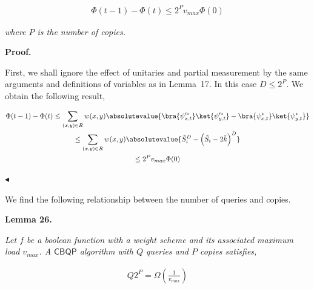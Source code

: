 \documentclass[10pt,a4paper]{article}
\begin{document}
\[\begin{gathered}
\displaystyle\Phi(t-1)-\Phi(t)\leq 2^{P}v_{max}\Phi(0)
\end{gathered}\]


\emph{where $P$ is the number of copies.}\par






\par\medskip\noindent\textbf{Proof.}\par




First, we shall ignore the effect of unitaries and partial measurement by the same arguments and definitions of variables as in Lemma 17. In this case $D\leq 2^{P}$. We obtain the following result,\par


\[\begin{gathered}
\displaystyle\Phi(t-1)-\Phi(t)\leq \displaystyle\sum_{(x,y)\in R}w(x,y)\absolutevalue{\bra{\psi_{x,t}^{\prime*}}\ket{\psi_{y,t}^{\prime*}}-\bra{\psi_{x,t}^{*}}\ket{\psi_{y,t}^{*}}} \\
\displaystyle\leq \displaystyle\sum_{(x,y)\in R}w(x,y)\absolutevalue{\hat{S}_{i}^{D}-\left(\hat{S}_{i}-2\hat{k}\right)^{D}} \\
\displaystyle\leq \displaystyle 2^{P}v_{max}\Phi(0)
\end{gathered}\]


$\blacktriangleleft$\par




We find the following relationship between the number of queries and copies.\par





\par\medskip\noindent\textbf{
\textbf{Lemma 26}\textbf{.}
}\par



\emph{Let $f$ be a boolean function with a weight scheme and its associated maximum load $v_{max}$. A $\mathsf{CBQP}$ algorithm with $Q$ queries and $P$ copies satisfies,}\par


\[\begin{gathered}
\displaystyle Q2^{P}=\Omega\left(\frac{1}{v_{max}}\right)
\end{gathered}\]
\end{document}

